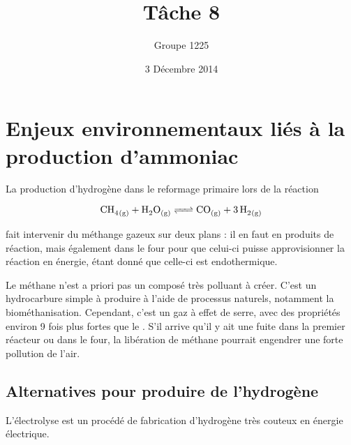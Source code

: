 \documentclass[a4paper, oneside, 12pt]{article}
\title{Tâche 8}
\author{Groupe 1225}
\date{3 Décembre 2014}
\begin{document}
\maketitle

\section*{Enjeux environnementaux liés à la production d'ammoniac}

La production d'hydrogène dans le reformage primaire lors de la réaction

\begin{equation*}
	\ce{CH4_{(g)} + H2O_{(g)} <=> CO_{(g)} + 3 \, H2_{(g)}} 
\end{equation*}

fait intervenir du méthange gazeux sur deux plans : il en faut en produits de réaction, 
mais également dans le four pour que celui-ci puisse approvisionner la réaction en énergie, étant donné que celle-ci est endothermique. 

Le méthane n'est a priori pas un composé très polluant à créer. C'est un hydrocarbure simple à produire à l'aide de processus naturels, notamment la biométhanisation. 
Cependant, c'est un gaz à effet de serre, avec des propriétés environ 9 fois plus fortes que le . 
S'il arrive qu'il y ait une fuite dans la premier réacteur ou dans le four, la libération de méthane pourrait engendrer une forte pollution de l'air.

\subsection{Alternatives pour produire de l'hydrogène}

L'électrolyse est un procédé de fabrication d'hydrogène très couteux en énergie électrique. 
\end{document}
